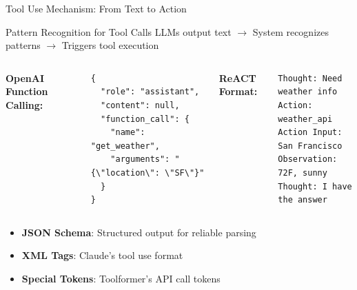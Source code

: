 \documentclass[aspectratio=169]{beamer}
\begin{document}
\begin{frame}[fragile]{Tool Use Mechanism: From Text to Action}
	\begin{block}{Pattern Recognition for Tool Calls}
		LLMs output text $\rightarrow$ System recognizes patterns $\rightarrow$ Triggers tool execution
	\end{block}
	
	\begin{columns}
		\textbf{OpenAI Function Calling:}
		\begin{lstlisting}[basicstyle=\tiny]
{
  "role": "assistant",
  "content": null,
  "function_call": {
    "name": "get_weather",
    "arguments": "{\"location\": \"SF\"}"
  }
}
		\end{lstlisting}
		
		\textbf{ReACT Format:}
		\begin{lstlisting}[basicstyle=\tiny]
Thought: Need weather info
Action: weather_api
Action Input: San Francisco
Observation: 72F, sunny
Thought: I have the answer
		\end{lstlisting}
	\end{columns}
	
	\vspace{0.3cm}
	\begin{itemize}
		\item {\color{highlight}\textbf{JSON Schema}}: Structured output for reliable parsing
		\item {\color{highlight}\textbf{XML Tags}}: Claude's tool use format
		\item {\color{highlight}\textbf{Special Tokens}}: Toolformer's API call tokens
	\end{itemize}
\end{frame}
\end{document}
